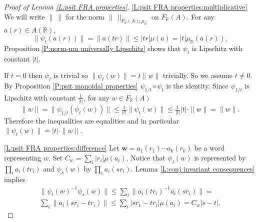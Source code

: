 \documentclass[12pt]{amsart}
\theoremstyle{definition}
\def\RR{\ensuremath{\mathbb{R}}}
\newcommand{\B}[1]{\mathbf{#1}}
\def\Free{F}
\begin{document}
\begin{proof}[Proof of Lemma \ref{L:psit FRA properties}]
\ref{L:psit FRA properties:multiplicative}
We will write $\| \ \|$ for the norm $\| \ \|_{\Free_\RR(A);\mu_\RR}$ on $\Free_\RR(A)$.
For any $a(r) \in A(\RR)$,
\[
\| \psi_t(a(r))\| =
\| a(tr)\| \leq 
|tr| \mu(a) =
|t| \mu_\RR(a(r)).
\] 
Proposition \ref{P:norm-mu universally Lipschitz} shows that $\psi_t$ is Lipschitz with constant $|t|$.

If $t=0$ then $\psi_t$ is trivial so $\| \psi_t(w)\|=t\|w\|$ trivially.
So we assume $t \neq 0$.
By Proposition \ref{P:psit monoidal properties} $\psi_{1/t} \circ \psi_t$ is the identity.
Since $\psi_{1/t}$ is Lipschitz with constant $\tfrac{1}{|t|}$, for any $w \in\Free_\RR(A)$
\[
\|w\| = \| \psi_{1/t}(\psi_t(w))\| \leq \tfrac{1}{|t|} \| \psi_t(w)\| \leq \tfrac{1}{|t|}|t| \cdot \|w\| = \| w\|.
\]
Therefore the inequalities are equalities and in particular $\|\psi_t(w)\|=|t| \cdot \|w\|$.


\smallskip
\noindent
\ref{L:psit FRA properties:difference}
Let $\B w=a_1(r_1) \cdots a_k(r_k)$ be a word representing $w$.
Set $C_w=\sum_i |r_i| \mu(a_i)$.
Notice that $\psi_t(w)$ is represented by $\prod_i a_i(tr_i)$ and $\psi_s(w)$ by $\prod_i a_i(sr_i)$.
Lemma \ref{L:conj invariant consequences} implies
\begin{multline*}
\| \psi_t(w)^{-1} \psi_s(w)\| \leq \sum_i \| a_i(tr_i)^{-1}a_i(sr_i)\| =
 \\
\sum_i \| a_i(sr_i-tr_i)\| \leq 
\sum_i |sr_1-tr_i| \mu(a_i) = C_w|s-t|.
\end{multline*}
\end{proof}










\end{document}
